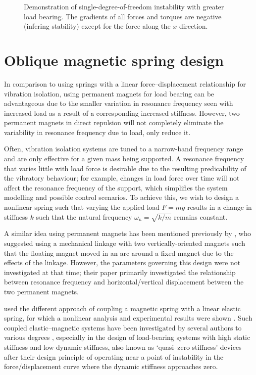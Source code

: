\documentclass[11pt,a4paper]{memoir}
\begin{document}
\begin{figure}
  \caption{
    Demonstration of single-degree-of-freedom instability with greater load bearing.
    The gradients of all forces and torques are negative (infering stability)
    except for the force along the $x$ direction.
  }
\end{figure}



\section{Oblique magnetic spring design}

In comparison to using springs with a linear force--displacement relationship for vibration isolation, using permanent magnets for load bearing can be advantageous due to the smaller variation in resonance frequency seen with increased load as a result of a corresponding increased stiffness.
However, two permanent magnets in direct repulsion will not completely eliminate the variability in resonance frequency due to load, only reduce it.

Often, vibration isolation systems are tuned to a narrow-band frequency range and are only effective for a given mass being supported.
A resonance frequency that varies little with load force is desirable due to the resulting predicability of the vibratory behaviour; for example, changes in load force over time will not affect the resonance frequency of the support, which simplifies the system modelling and possible control scenarios.
To achieve this, we wish to design a nonlinear spring such that varying the applied load $F=mg$ results in a change in stiffness $k$ such that the natural frequency $\omega_n=\sqrt{k/m}$ remains constant.

A similar idea using permanent magnets has been mentioned previously by \textcite{todaka2001-ietm}, who suggested using a mechanical linkage with two vertically-oriented magnets such that the floating magnet moved in an arc around a fixed magnet due to the effects of the linkage.
However, the parameters governing this design were not investigated at that time; their paper primarily investigated the relationship between resonance frequency and horizontal/vertical displacement between the two permanent magnets.

\citeauthor{bonisoli2007-mrc} used the different approach of coupling a magnetic spring with a linear elastic spring, for which a nonlinear analysis and experimental results were shown \parencite{bonisoli2007-mssp, bonisoli2007-mrc}.
Such coupled elastic--magnetic systems have been investigated by several authors to various degrees \parencite{trimboli1994, beccaria1997,carrella2008-jsv,zhou2010-jsv}, especially in the design of load-bearing systems with high static stiffness and low dynamic stiffness, also known as `quasi--zero stiffness' devices after their design principle of operating near a point of instability in the force/displacement curve where the dynamic stiffness approaches zero.
\end{document}
